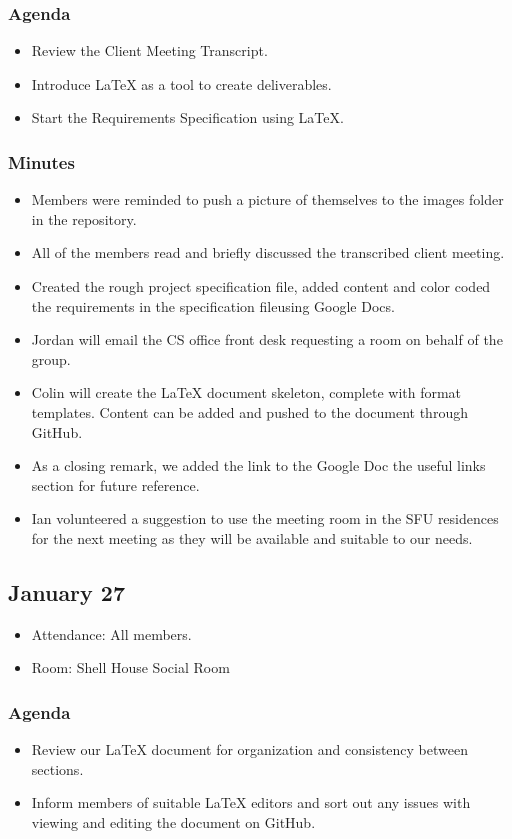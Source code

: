 \documentclass{article}
\begin{document}
\subsubsection{Agenda}
\begin{itemize}
\item Review the Client Meeting Transcript.
\item Introduce LaTeX as a tool to create deliverables.
\item Start the Requirements Specification using LaTeX.
\end{itemize}
\subsubsection{Minutes}
\begin{itemize}
\item Members were reminded to push a picture of themselves to the images folder in the repository.
\item All of the members read and briefly discussed the transcribed client meeting.
\item Created the rough project specification file, added content and color coded the requirements in the specification file{using Google Docs}.
\item Jordan will email the CS office front desk requesting a room on behalf of the group.
\item Colin will create the LaTeX document skeleton, complete with format templates. Content can be added and pushed to the document through GitHub.
\item As a closing remark, we added the link to the Google Doc the useful links section for future reference. 
\item Ian volunteered a suggestion to use the meeting room in the SFU residences for the next meeting as they will be available and suitable to our needs.
\end{itemize}

\subsection{January 27}
\begin{itemize}
\item Attendance: All members.
\item Room: Shell House Social Room
\end{itemize}
\subsubsection{Agenda}
\begin{itemize}
\item Review our LaTeX document for organization and consistency between sections.
\item Inform members of suitable LaTeX editors and sort out any issues with viewing and editing the document on GitHub.
\end{itemize}
\end{document}
